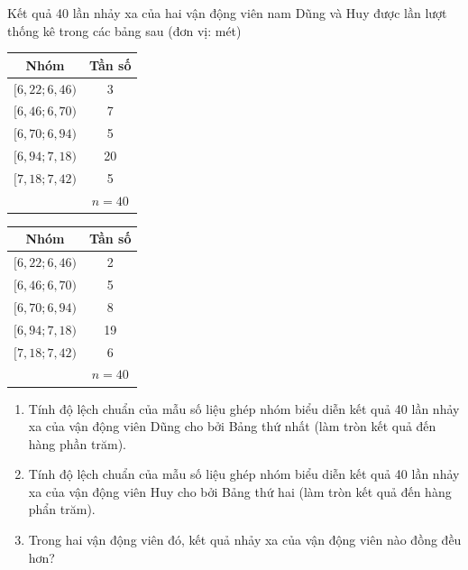 \begin{bt}[Mức độ 3]%
	Kết quả 40 lần nhảy xa của hai vận động viên nam Dũng và Huy được lần lượt thống kê trong các bảng sau (đơn vị: mét)
	\begin{center}
		\begin{tabular}{|c|c|}
			\hline Nhóm & Tần số \\
			\hline$[6,22 ; 6,46)$ & 3 \\
			{$[6,46 ; 6,70)$} & 7 \\
			{$[6,70 ; 6,94)$} & 5 \\
			{$[6,94 ; 7,18)$} & 20 \\
			{$[7,18 ; 7,42)$} & 5 \\
			\hline & $n=40$ \\
			\hline
		\end{tabular}
		\begin{tabular}{|c|c|}
			\hline Nhóm & Tần số \\
			\hline$[6,22 ; 6,46)$ & 2 \\
			{$[6,46 ; 6,70)$} & 5 \\
			{$[6,70 ; 6,94)$} & 8 \\
			{$[6,94 ; 7,18)$} & 19 \\
			{$[7,18 ; 7,42)$} & 6 \\
			\hline & $n=40$ \\
			\hline
		\end{tabular}
	\end{center}
	\begin{enumerate}
		\item  Tính độ lệch chuẩn của mẫu số liệu ghép nhóm biểu diễn kết quả 40 lần nhảy xa của vận động viên Dũng cho bởi Bảng thứ nhất (làm tròn kết quả đến hàng phần trăm).
		\item Tính độ lệch chuẩn của mẫu số liệu ghép nhóm biểu diễn kết quả 40 lần nhảy xa của vận động viên Huy cho bởi Bảng thứ hai (làm tròn kết quả đến hàng phẩn trăm).
		\item Trong hai vận động viên đó, kết quả nhảy xa của vận động viên nào đồng đều hơn?
	\end{enumerate}
\end{bt}
